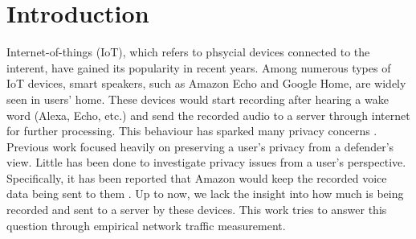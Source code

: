 \section{Introduction}
Internet-of-things (IoT), which refers to phsycial devices connected to the interent, have gained its popularity in recent years. Among numerous types of IoT devices, smart speakers, such as Amazon Echo and Google Home, are widely seen in users' home. These devices would start recording after hearing a wake word (Alexa, Echo, etc.) and send the recorded audio to a server through internet for further processing. This behaviour has sparked many privacy concerns \cite{fowler_2019, apthorpe2017smart, apthorpe2019keeping, apthorpe2017spying, acar2018peek}. Previous work \cite{apthorpe2017smart, apthorpe2019keeping, apthorpe2017spying, acar2018peek} focused heavily on preserving a user's privacy from a defender's view. Little has been done to investigate privacy issues from a user's perspective. Specifically, it has been reported that Amazon would keep the recorded voice data being sent to them \cite{kelly_statt_2019, osborne_2019}. Up to now, we lack the insight into how much is being recorded and sent to a server by these devices. This work tries to answer this question through empirical network traffic measurement.